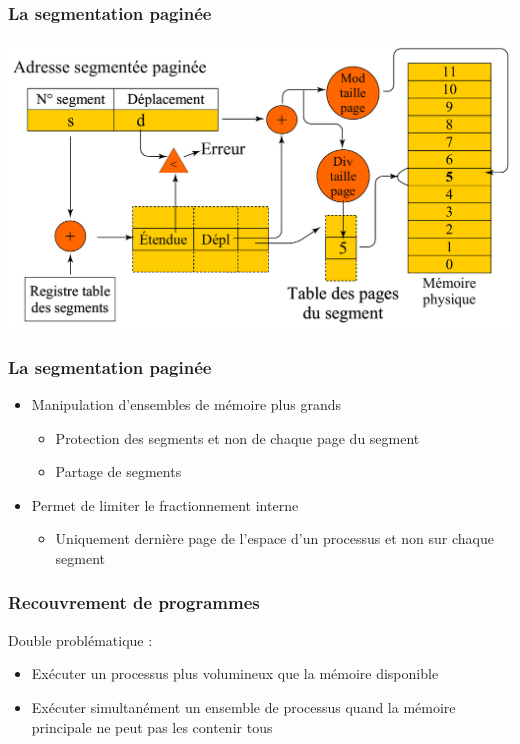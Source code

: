 \begin{frame}
\frametitle{La segmentation paginée}
\includegraphics[width=\textwidth]{../illustration/memoire_segment_paginee_calcul.pdf}
\end{frame}


\begin{frame}
\frametitle{La segmentation paginée}
\begin{itemize}
\item Manipulation d'ensembles de mémoire plus grands
\begin{itemize}
\item Protection des segments et non de chaque page du segment
\item Partage de segments
\end{itemize}
\item Permet de limiter le fractionnement interne
\begin{itemize}
\item Uniquement dernière page de l'espace d'un processus et non sur chaque segment
\end{itemize}
\end{itemize}
\end{frame}


\begin{frame}
\frametitle{Recouvrement de programmes}
Double problématique :
\begin{itemize}
\item Exécuter un processus plus volumineux que la mémoire disponible
\item Exécuter simultanément un ensemble de processus quand la mémoire principale ne peut pas les contenir tous
\end{itemize}
\end{frame}

